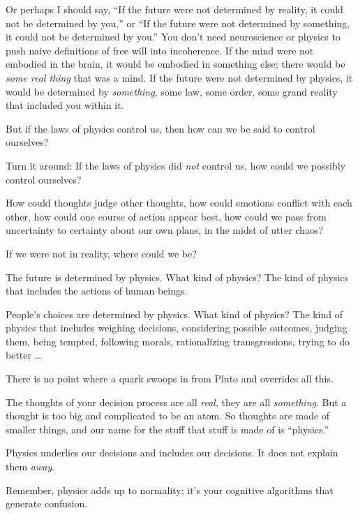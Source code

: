 {
 Or perhaps I should say, ``If the future were not
determined by reality, it could not be determined by
you,'' or ``If the future were not
determined by something, it could not be determined by
you.'' You don't need neuroscience or
physics to push naive definitions of free will into incoherence. If the
mind were not embodied in the brain, it would be embodied in something
else; there would be \textit{some real thing} that was a mind. If the
future were not determined by physics, it would be determined by
\textit{something}, some law, some order, some grand reality that
included you within it.}

{
 But if the laws of physics control us, then how can we be said to
control ourselves?}

{
 Turn it around: If the laws of physics did \textit{not} control
us, how could we possibly control ourselves?}

{
 How could thoughts judge other thoughts, how could emotions
conflict with each other, how could one course of action appear best,
how could we pass from uncertainty to certainty about our own plans, in
the midst of utter chaos?}

{
 If we were not in reality, where could we be?}

{
 The future is determined by physics. What kind of physics? The
kind of physics that includes the actions of human beings.}

{
 People's choices are determined by physics. What
kind of physics? The kind of physics that includes weighing decisions,
considering possible outcomes, judging them, being tempted, following
morals, rationalizing transgressions, trying to do better \ldots}

{
 There is no point where a quark swoops in from Pluto and overrides
all this.}

{
 The thoughts of your decision process are all \textit{real}, they
are all \textit{something}. But a thought is too big and complicated to
be an atom. So thoughts are made of smaller things, and our name for
the stuff that stuff is made of is
``physics.''}

{
 Physics underlies our decisions and includes our decisions. It
does not explain them \textit{away}.}

{
 Remember, physics adds up to normality; it's your
cognitive algorithms that generate confusion.}

\myendsectiontext


